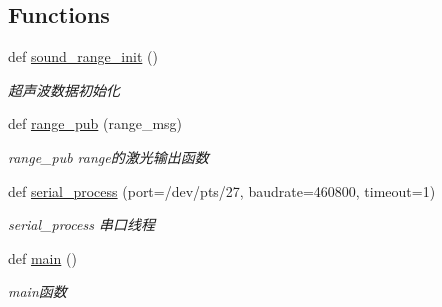 \subsection*{Functions}
\begin{DoxyCompactItemize}
\item 
def \hyperlink{namespaceserial__af_a5187c1672dbeadeffa2db70fc33466fe}{sound\+\_\+range\+\_\+init} ()
\begin{DoxyCompactList}\small\item\em 超声波数据初始化 \end{DoxyCompactList}\item 
def \hyperlink{namespaceserial__af_aabbd1e43de1cd4d1a46a61a1cb743e12}{range\+\_\+pub} (range\+\_\+msg)
\begin{DoxyCompactList}\small\item\em range\+\_\+pub range的激光输出函数 \end{DoxyCompactList}\item 
def \hyperlink{namespaceserial__af_aa88a0e49ebc995801b7957de5f840495}{serial\+\_\+process} (port=\textquotesingle{}/dev/pts/27\textquotesingle{}, baudrate=460800, timeout=1)
\begin{DoxyCompactList}\small\item\em serial\+\_\+process 串口线程 \end{DoxyCompactList}\item 
def \hyperlink{namespaceserial__af_af84db65a10932c888008e984b4bf980e}{main} ()
\begin{DoxyCompactList}\small\item\em main函数 \end{DoxyCompactList}\end{DoxyCompactItemize}
